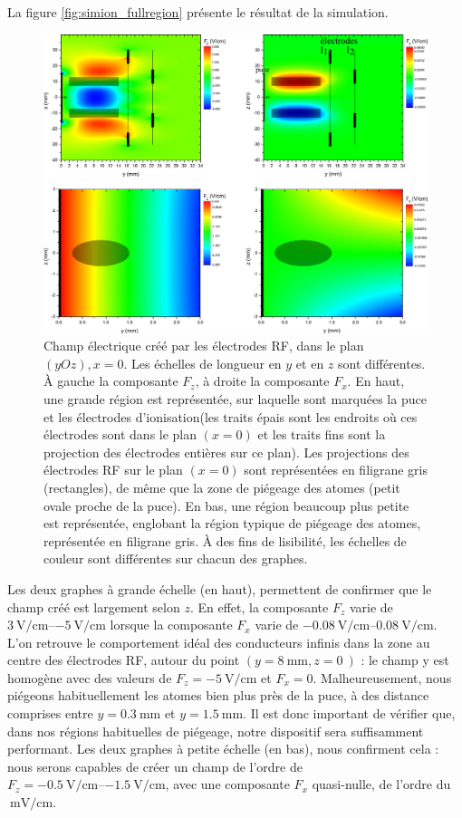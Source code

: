 La figure \eqref{fig:simion_fullregion} présente le résultat de la simulation.
%
\begin{figure}[!h]
\centering
\includegraphics[width=\linewidth]{figures/setup/rydberg/simion_4quadrants}
\caption[Champ électrique créé par les électrodes RF]{
Champ électrique créé par les électrodes RF, dans le plan $(yOz),x=0$. Les échelles de longueur en $y$ et en $z$ sont différentes.
\`A gauche la composante $F_z$, à droite la composante $F_x$.
En haut, une grande région est représentée, sur laquelle sont marquées la puce et les électrodes d'ionisation(les traits épais sont les endroits où ces électrodes sont dans le plan $(x=0)$ et les traits fins sont la projection des électrodes entières sur ce plan). Les projections des électrodes RF sur le plan $(x=0)$ sont représentées en filigrane gris (rectangles), de même que la zone de piégeage des atomes (petit ovale proche de la puce).
En bas, une région beaucoup plus petite est représentée, englobant la région typique de piégeage des atomes, représentée en filigrane gris.
\`A des fins de lisibilité, les échelles de couleur sont différentes sur chacun des graphes.
}
\label{fig:simion_fullregion}
\end{figure}
%
Les deux graphes à grande échelle (en haut), permettent de confirmer que le champ créé est largement selon $z$.
En effet, la composante $F_z$ varie de $\SIrange{+3}{-5}{\V/\cm}$ lorsque la composante $F_x$ varie de $\SIrange{-0.08}{+0.08}{\V/\cm}$.
L'on retrouve le comportement idéal des conducteurs infinis dans la zone au centre des électrodes RF, autour du point $(y= \SI{8}{\mm}, z=\SI{0}{})$ : le champ y est homogène avec des valeurs de $F_z=\SI{-5}{\V/\cm}$ et $F_x=0$.
Malheureusement, nous piégeons habituellement les atomes bien plus près de la puce, à des distance comprises entre $y=\SI{0.3}{\mm}$ et $y=\SI{1.5}{\mm}$.
Il est donc important de vérifier que, dans nos régions habituelles de piégeage, notre dispositif sera suffisamment performant.
Les deux graphes à petite échelle (en bas), nous confirment cela :
nous serons capables de créer un champ de l'ordre de $F_z=\SIrange{-0.5}{-1.5}{\V/\cm}$, avec une composante $F_x$ quasi-nulle, de l'ordre du $\SI{}{\milli\V/\cm}$.

